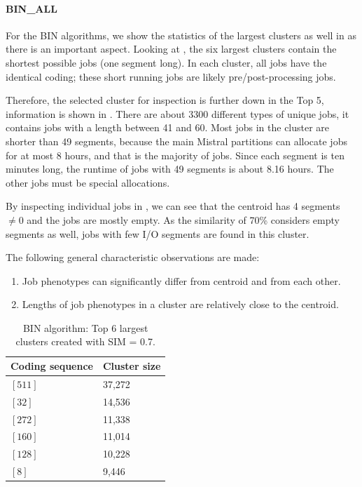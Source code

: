 \documentclass{jhps}
\begin{document}
\FloatBarrier
\paragraph{BIN\_ALL}
For the BIN algorithms, we show the statistics of the largest clusters as well in  as there is an important aspect.
Looking at , the six largest clusters contain the shortest possible jobs (one segment long).
In each cluster, all jobs have the identical coding; these short running jobs are likely pre/post-processing jobs.

Therefore, the selected cluster for inspection is further down in the Top 5, information is shown in .
There are about 3300 different types of unique jobs, it contains jobs with a length between 41 and 60.
Most jobs in the cluster are shorter than 49 segments, because the main Mistral partitions can allocate jobs for at most 8 hours, and that is the majority of jobs.
Since each segment is ten minutes long, the runtime of jobs with 49 segments is about 8.16 hours.
The other jobs must be special allocations.

By inspecting individual jobs in , we can see that the centroid has 4 segments $\neq 0$ and the jobs are mostly empty.
As the similarity of 70\% considers empty segments as well, jobs with few I/O segments are found in this cluster.

The following general characteristic observations are made:
\begin{enumerate}
 \item Job phenotypes can significantly differ from centroid and from each other.
 \item Lengths of job phenotypes in a cluster are relatively close to the centroid.
\end{enumerate}

\begin{table}
	\centering
	\begin{tabular}{ll}
		Coding sequence & Cluster size \\
		\midrule
		$[511]$ & 37,272 \\
		$[32]$  & 14,536 \\
		$[272]$ & 11,338 \\
		$[160]$ & 11,014 \\
		$[128]$ & 10,228 \\
		$[8]$   & 9,446  \\
	\end{tabular}
	\caption{BIN algorithm: Top 6 largest clusters created with SIM = 0.7.}
	\label{tab:bin:largest_clusters}
\end{table}
\end{document}
